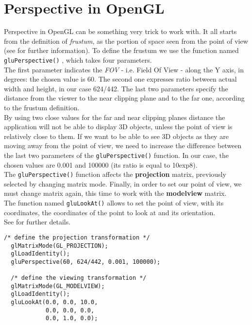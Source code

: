 \section{Perspective in OpenGL}
\label{opengl:perspective}

Perspective in OpenGL can be something very trick to work with. 
It all starts from the definition of \textit{frustum}, as the portion
of space seen from the point of view (see \cite{wiki:frustum} 
for further information). To define the frustum we use the function
named \texttt{gluPerspective()} \cite{opengl:gluPerspective}, which takes 
four parameters.
\\
The first parameter indicates the \textit{FOV} - i.e. Field Of View -
along the Y axis, in degrees: the chosen value is 60. The
second one expresses ratio between actual width and height, 
in our case 624/442. The last two parameters specify the distance 
from the viewer to the near clipping plane and to the far one, 
according to the frustum definition.
\\
By using two close values for the far and near clipping planes 
distance the application will not be able to display 3D
objects, unless the point of view is relatively close to them. 
If we want to be able to see 3D objects as they are moving away
from the point of view, we need to increase the difference between 
the last two parameters of the \texttt{gluPerspective()} function. In
our case, the chosen values are 0.001 and 100000 (its ratio is 
equal to 10exp8).
\\
The \texttt{gluPerspective()} function affects the \textbf{projection} 
matrix, previously selected by changing matrix mode. Finally,
in order to set our point of view, we must change matrix again, 
this time to work with the \textbf{modelview} matrix.
\\
The function named
\texttt{gluLookAt()} allows to set the point of view, with its coordinates, 
the coordinates of the point to look at and its orientation.
\\
See \cite{opengl:gluLookAt} for further details.
\\
\begin{lstlisting}[caption={OpenGL perspective example}, label={code:perspective}]
  /* define the projection transformation */
  glMatrixMode(GL_PROJECTION);
  glLoadIdentity();
  gluPerspective(60, 624/442, 0.001, 100000);
  
  /* define the viewing transformation */
  glMatrixMode(GL_MODELVIEW);
  glLoadIdentity();
  gluLookAt(0.0, 0.0, 10.0,
            0.0, 0.0, 0.0,
            0.0, 1.0, 0.0);
\end{lstlisting}
